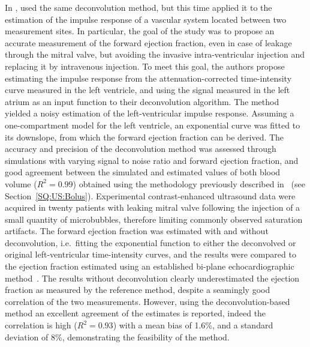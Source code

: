 In \citeyear{Mischi:2005df}, \citet{Mischi:2005df} used the same deconvolution method, but this time applied it to the estimation of the impulse response of a vascular system located between two measurement sites.
In particular, the goal of the study was to propose an accurate measurement of the forward ejection fraction, even in case of leakage through the mitral valve, but avoiding the invasive intra-ventricular injection and replacing it by intravenous injection.
To meet this goal, the authors propose estimating the impulse response from the attenuation-corrected time-intensity curve measured in the left ventricle, and using the signal measured in the left atrium as an input function to their deconvolution algorithm.
The method yielded a noisy estimation of the left-ventricular impulse response.
Assuming a one-compartment model for the left ventricle, an exponential curve was fitted to its downslope, from which the forward ejection fraction can be derived.
The accuracy and precision of the deconvolution method was assessed through simulations with varying signal to noise ratio and forward ejection fraction, and good agreement between the simulated and estimated values of both blood volume ($R^2 = 0.99$) obtained using the methodology previously described in~\cite{Mischi:2004cn} (see Section~\ref{SQ:US:Bolus}).
Experimental contrast-enhanced ultrasound data were acquired in twenty patients with leaking mitral valve following the injection of a small quantity of microbubbles, therefore limiting commonly observed saturation artifacts.
The forward ejection fraction was estimated with and without deconvolution, i.e.~fitting the exponential function to either the deconvolved or original left-ventricular time-intensity curves, and the results were compared to the ejection fraction estimated using an established bi-plane echocardiographic method~\cite{BroganIII:1992dt}.
The results without deconvolution clearly underestimated the ejection fraction as measured by the reference method, despite a seamingly good correlation of the two measurements.
However, using the deconvolution-based method an excellent agreement of the estimates is reported, indeed the correlation is high ($R^2 = 0.93$) with a mean bias of 1.6\%, and a standard deviation of 8\%, demonstrating the feasibility of the method.


